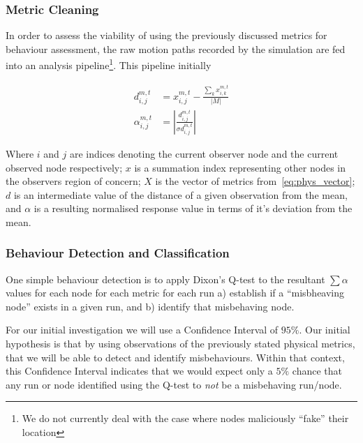 \documentclass[conference]{IEEEtran}
\begin{document}
\subsubsection{Metric Cleaning}
In order to assess the viability of using the previously discussed metrics for behaviour assessment, the raw motion paths recorded by the simulation are fed into an analysis pipeline\footnote{We do not currently deal with the case where nodes maliciously ``fake'' their location}.
This pipeline initially 

\begin{align}
  d_{i,j}^{m,t} &= x_{i,j}^{m,t} - \frac{\sum_k x_{i,k}^{m,t}}{|M|}\label{eq:d}\\
  \alpha_{i,j}^{m,t} &= | \frac{d_{i,j}^{m,t}}{\sigma{d_{i,j}^{m,t}}}|\label{eq:dd}
\end{align}

Where $i$ and $j$ are indices denoting the current observer node and the current observed node respectively; $x$ is a summation index representing other nodes in the observers region of concern; $X$ is the vector of metrics from~\ref{eq:phys_vector}; $d$ is an intermediate value of the distance of a given observation from the mean, and $\alpha$ is a resulting normalised response value in terms of it's deviation from the mean.

\subsubsection{Behaviour Detection and Classification}

One simple behaviour detection is to apply Dixon's Q-test \cite{Dean1951} to the resultant $\sum\alpha$ values for each node for each metric for each run  a) establish if a ``misbheaving node'' exists in a given run, and b) identify that misbehaving node. 


For our initial investigation we will use a Confidence Interval of $95\%$.
Our initial hypothesis is that by using observations of the previously stated physical metrics, that we will be able to detect and identify misbehaviours.
Within that context, this Confidence Interval indicates that we would expect only a $5\%$ chance that any run or node identified using the Q-test to \emph{not} be a misbehaving run/node.
\end{document}

